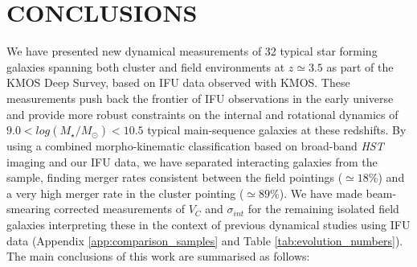 \documentclass[fleqn,usenatbib]{mnras}
\begin{document}
\section{CONCLUSIONS}\label{sec:conclusion}
We have presented new dynamical measurements of 32 typical star forming galaxies spanning both cluster and field environments at $z\simeq3.5$ as part of the KMOS Deep Survey, based on IFU data observed with KMOS.
These measurements push back the frontier of IFU observations in the early universe and provide more robust constraints on the internal and rotational dynamics of $9.0 < log(M_{\star}/M_{\odot})< 10.5$ typical main-sequence galaxies at these redshifts.
By using a combined morpho-kinematic classification based on broad-band {\em HST} imaging and our IFU data, we have separated interacting galaxies from the sample, finding merger rates consistent between the field pointings ($\simeq18\%$) and a very high merger rate in the cluster pointing ($\simeq89\%$).
We have made beam-smearing corrected measurements of $V_{C}$ and $\sigma_{int}$ for the remaining isolated field galaxies interpreting these in the context of previous dynamical studies using IFU data (Appendix \ref{app:comparison_samples} and Table \ref{tab:evolution_numbers}).
The main conclusions of this work are summarised as follows:
\end{document}

